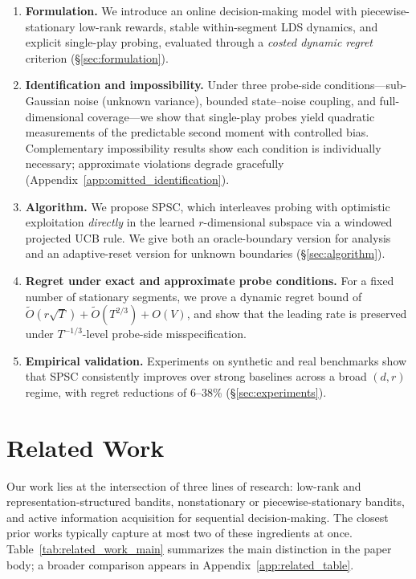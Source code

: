 \documentclass{article}
\begin{document}
  \begin{enumerate}[leftmargin=1.5em, itemsep=2pt]
  \item \textbf{Formulation.}
  We introduce an online decision-making model with
  piecewise-stationary low-rank rewards, stable within-segment LDS
  dynamics, and explicit single-play probing, evaluated through a
  \emph{costed dynamic regret} criterion (\S\ref{sec:formulation}).

  \item \textbf{Identification and impossibility.}
  Under three probe-side conditions---sub-Gaussian noise (unknown
  variance), bounded state--noise coupling, and full-dimensional
  coverage---we show that single-play probes yield quadratic
  measurements of the predictable second moment with controlled
  bias. Complementary impossibility results show each condition is
  individually necessary; approximate violations degrade gracefully
  (Appendix~\ref{app:omitted_identification}).

  \item \textbf{Algorithm.}
  We propose SPSC, which interleaves probing with optimistic
  exploitation \emph{directly} in the learned $r$-dimensional
  subspace via a windowed projected UCB rule. We give both an
  oracle-boundary version for analysis and an adaptive-reset version
  for unknown boundaries (\S\ref{sec:algorithm}).

  \item \textbf{Regret under exact and approximate probe conditions.}
  For a fixed number of stationary segments, we prove a dynamic
  regret bound of
  $\widetilde{O}(r\sqrt{T}) + \widetilde{O}(T^{2/3}) + O(V)$,
  and show that the leading rate is preserved under
  $T^{-1/3}$-level probe-side misspecification.

  \item \textbf{Empirical validation.}
  Experiments on synthetic and real benchmarks show that SPSC
  consistently improves over strong baselines across a broad
  $(d,r)$ regime, with regret reductions of 6--38\%
  (\S\ref{sec:experiments}).
  \end{enumerate}


\section{Related Work}
\label{sec:related}

Our work lies at the intersection of three lines of research: low-rank and representation-structured bandits, nonstationary or piecewise-stationary bandits, and active information acquisition for sequential decision-making.
The closest prior works typically capture at most two of these ingredients at once.
Table~\ref{tab:related_work_main} summarizes the main distinction in the paper body; a broader comparison appears in Appendix~\ref{app:related_table}.
\end{document}
